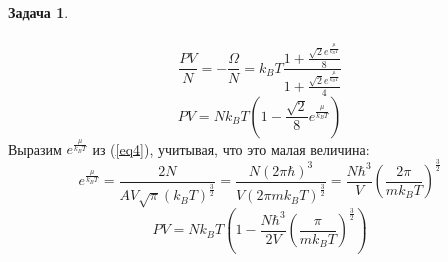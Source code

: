 \documentclass[12pt]{article}
\theoremstyle{definition}
\newtheorem{zad}{Задача}[section]
\begin{document}
\begin{zad}
\begin{enumerate}
\begin{multline}
\end{multline}
\begin{equation}
    \frac{PV}{N}=-\frac{\Omega}{N}=k_BT\frac{1+\frac{\sqrt{2}e^\frac{\mu}{k_BT}}{8}}{1+\frac{\sqrt{2}e^\frac{\mu}{k_BT}}{4}}
\end{equation}
\begin{equation}
    PV=Nk_BT\left(1-\frac{\sqrt{2}}{8}e^\frac{\mu}{k_BT}\right)
\end{equation}
Выразим $e^\frac{\mu}{k_BT}$ из (\ref{eq4}), учитывая, что это малая величина:
\begin{equation}
    e^\frac{\mu}{k_BT}=\frac{2N}{AV\sqrt{\pi}(k_BT)^\frac{3}{2}}=\frac{N(2\pi\hbar)^3}{V(2\pi mk_BT)^\frac{3}{2}}=\frac{N\hbar^3}{V}\left(\frac{2\pi}{mk_BT}\right)^\frac{3}{2}
\end{equation}
\begin{equation}
    \boxed{PV=Nk_BT\left(1-\frac{N\hbar^3}{2V}\left(\frac{\pi}{mk_BT}\right)^\frac{3}{2}\right)}
\end{equation}
\end{enumerate}
\end{zad}
\end{document}
